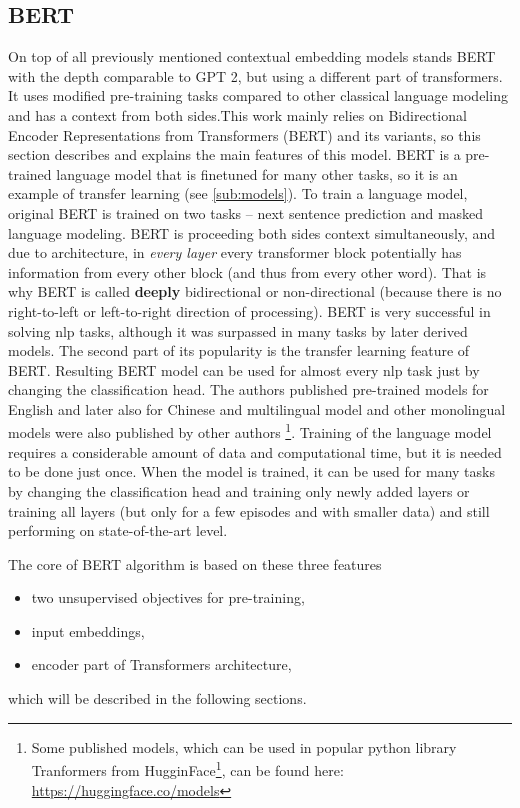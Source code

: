 \subsection{BERT}
On top of all previously mentioned contextual embedding models stands BERT with the depth comparable to GPT 2, but using a different part of transformers. It uses modified pre-training tasks compared to other classical language modeling and has a context from both sides.This work mainly relies on Bidirectional Encoder Representations from Transformers (BERT) \citep{Devlin2019} and its variants, so this section describes and explains the main features of this model. BERT is a pre-trained language model that is finetuned for many other tasks, so it is an example of transfer learning (see \ref{sub:models}).
To train a language model, original BERT is trained on two tasks -- next sentence prediction and masked language modeling. BERT is proceeding both sides context simultaneously, and due to architecture, in \textit{every layer} every transformer block potentially has information from every other block (and thus from every other word). That is why BERT is called \textbf{deeply} bidirectional or non-directional (because there is no right-to-left or left-to-right direction of processing). BERT is very successful in solving \acrshort{nlp} tasks, although it was surpassed in many tasks by later derived models. 
The second part of its popularity is the transfer learning feature of BERT. Resulting BERT model can be used for almost every \acrshort{nlp} task just by changing the classification head. The authors published pre-trained models for English and later also for Chinese and multilingual model and other monolingual models were also published by other authors \footnote{Some published models, which can be used in popular python library Tranformers from HugginFace\footnote{https://huggingface.co/}, can be found here: \url{https://huggingface.co/models}}. Training of the language model requires a considerable amount of data and computational time, but it is needed to be done just once. When the model is trained, it can be used for many tasks by changing the classification head and training only newly added layers or training all layers (but only for a few episodes and with smaller data) and still performing on state-of-the-art level. 
\par
The core of BERT algorithm is based on these three features
\begin{itemize}
\item two unsupervised objectives for pre-training,
\item input embeddings,
\item encoder part of Transformers architecture,
\end{itemize}
which will be described in the following sections.
